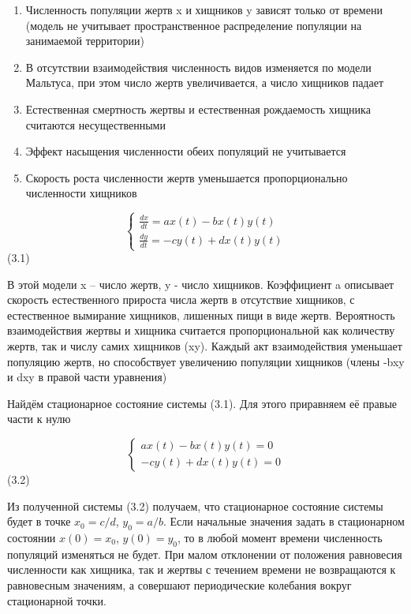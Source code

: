 \documentclass[
  12pt,
  a4paper,
  DIV=11,
  numbers=noendperiod]{scrreprt}
\begin{document}
\begin{enumerate}
\def\labelenumi{\arabic{enumi}.}
\item
  Численность популяции жертв x и хищников y зависят только от времени
  (модель не учитывает пространственное распределение популяции на
  занимаемой территории)
\item
  В отсутствии взаимодействия численность видов изменяется по модели
  Мальтуса, при этом число жертв увеличивается, а число хищников падает
\item
  Естественная смертность жертвы и естественная рождаемость хищника
  считаются несущественными
\item
  Эффект насыщения численности обеих популяций не учитывается
\item
  Скорость роста численности жертв уменьшается пропорционально
  численности хищников
\end{enumerate}

\[
\begin{cases}
\frac{dx}{dt} = ax(t) - bx(t)y(t)\\
\frac{dy}{dt} = -cy(t) + dx(t)y(t)
\end{cases}
\](3.1)

В этой модели x -- число жертв, y - число хищников. Коэффициент a
описывает скорость естественного прироста числа жертв в отсутствие
хищников, с естественное вымирание хищников, лишенных пищи в виде жертв.
Вероятность взаимодействия жертвы и хищника считается пропорциональной
как количеству жертв, так и числу самих хищников (xy). Каждый акт
взаимодействия уменьшает популяцию жертв, но способствует увеличению
популяции хищников (члены -bxy и dxy в правой части уравнения)

Найдём стационарное состояние системы (3.1). Для этого приравняем её
правые части к нулю

\[
\begin{cases}
ax(t)-bx(t)y(t) = 0\\
-cy(t)+dx(t)y(t) = 0
\end{cases}
\](3.2)

Из полученной системы (3.2) получаем, что стационарное состояние системы
будет в точке \(x_0 = c/d\), \(y_0 = a/b\). Если начальные значения
задать в стационарном состоянии \(x(0) = x_0\), \(y(0) = y_0\), то в
любой момент времени численность популяций изменяться не будет. При
малом отклонении от положения равновесия численности как хищника, так и
жертвы с течением времени не возвращаются к равновесным значениям, а
совершают периодические колебания вокруг стационарной точки.
\end{document}
